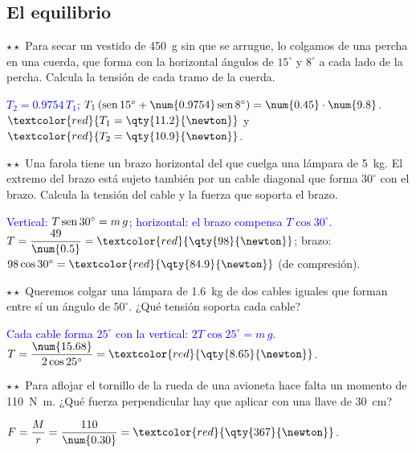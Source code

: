 \subsection{El equilibrio}

\begin{exercise}
    \(\star\star\) Para secar un vestido de \qty{450}{\g} sin que se arrugue, lo colgamos de una percha en una cuerda, que forma con
    la horizontal ángulos de \(15^\circ\) y \(8^\circ\) a cada lado de la percha. Calcula la tensión de cada tramo de la cuerda.
    \begin{solu}
        \textcolor{blue}{\(T_2 = \num{0.9754}\,T_1\); \(T_1\,(\sen 15^\circ + \num{0.9754}\sen 8^\circ) = \num{0.45} \cdot \num{9.8}\).}
        \(\textcolor{red}{T_1 = \qty{11.2}{\newton}}\) y \(\textcolor{red}{T_2 = \qty{10.9}{\newton}}\).
    \end{solu}
\end{exercise}

\begin{exercise}
    \(\star\star\) Una farola tiene un brazo horizontal del que cuelga una lámpara de \qty{5}{\kg}. El extremo del brazo está sujeto
    también por un cable diagonal que forma \(30^\circ\) con el brazo. Calcula la tensión del cable y la fuerza que soporta el brazo.
    \begin{solu}
        \textcolor{blue}{Vertical: \(T\operatorname{sen} 30^\circ = m\,g\); horizontal: el brazo compensa \(T\cos 30^\circ\).}
        \(T = \dfrac{49}{\num{0.5}} = \textcolor{red}{\qty{98}{\newton}}\); brazo: \(98\cos 30^\circ = \textcolor{red}{\qty{84.9}{\newton}}\)
        (de compresión).
    \end{solu}
\end{exercise}

\begin{exercise}
    \(\star\star\) Queremos colgar una lámpara de \qty{1.6}{\kg} de dos cables iguales que forman entre sí un ángulo de \(50^\circ\).
    ¿Qué tensión soporta cada cable?
    \begin{solu}
        \textcolor{blue}{Cada cable forma \(25^\circ\) con la vertical: \(2T\cos 25^\circ = m\,g\).}
        \(T = \dfrac{\num{15.68}}{2\cos 25^\circ} = \textcolor{red}{\qty{8.65}{\newton}}\).
    \end{solu}
\end{exercise}

\begin{exercise}
    \(\star\star\) Para aflojar el tornillo de la rueda de una avioneta hace falta un momento de \qty{110}{\newton\metre}. ¿Qué fuerza
    perpendicular hay que aplicar con una llave de \qty{30}{\cm}?
    \begin{solu}
        \(F = \dfrac{M}{r} = \dfrac{110}{\num{0.30}} = \textcolor{red}{\qty{367}{\newton}}\).
    \end{solu}
\end{exercise}

